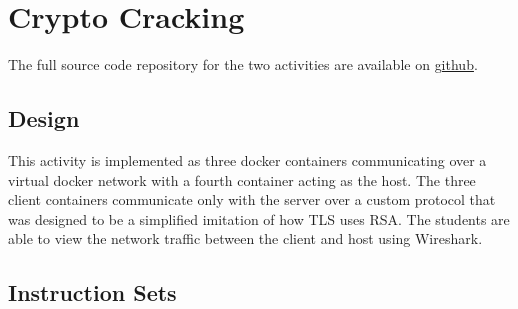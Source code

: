 \providecommand{\heading}[1]{\section{#1}}
\providecommand{\subheading}[1]{\subsection{#1}}

\section{Crypto Cracking}\label{subsec:CTFs-cc}
    The full source code repository for the two activities are available on \href{https://github.com/brendonky18/Honors-Thesis.CTFs}{github}.

    \subsection{Design}
        This activity is implemented as three docker containers communicating over a virtual docker network with a fourth container acting as the host.
        The three client containers communicate only with the server over a custom protocol that was designed to be a simplified imitation of how TLS uses RSA. 
        The students are able to view the network traffic between the client and host using Wireshark. 
        
    \subsection{Instruction Sets}\label{subsubsec:CTFs-cc-instructions}

